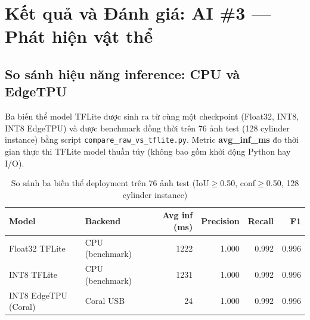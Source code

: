 
\section{Kết quả và Đánh giá: AI \#3 --- Phát hiện vật thể}
\label{sec:ai3-results}







\subsection{So sánh hiệu năng inference: CPU và EdgeTPU}
\label{subsec:ai3-latency}

Ba biến thể model TFLite được sinh ra từ cùng một checkpoint
(Float32, INT8, INT8 EdgeTPU) và được benchmark đồng thời trên
76 ảnh test (128 cylinder instance) bằng script
\texttt{compare\_raw\_vs\_tflite.py}. Metric \textbf{avg\_inf\_ms}
đo thời gian thực thi TFLite model thuần túy (không bao gồm
khởi động Python hay I/O).

\begin{table}[htbp]
  \centering
  \caption{So sánh ba biến thể deployment trên 76 ảnh test
           (IoU$\geq$0.50, conf$\geq$0.50, 128 cylinder instance)}
  \label{tab:ai3-latency}
  \small
  \begin{tabular}{llrrrr}
    \toprule
    \textbf{Model}        & \textbf{Backend}
      & \textbf{Avg inf (ms)} & \textbf{Precision} & \textbf{Recall} & \textbf{F1} \\
    \midrule
    Float32 TFLite        & CPU (benchmark) & 1222 & 1.000 & 0.992 & 0.996 \\
    INT8 TFLite           & CPU (benchmark) & 1231 & 1.000 & 0.992 & 0.996 \\
    INT8 EdgeTPU (Coral)  & Coral USB       &   24 & 1.000 & 0.992 & 0.996 \\
    \bottomrule
  \end{tabular}
\end{table}


